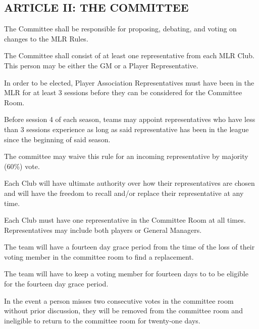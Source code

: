 \subsection{ARTICLE II: THE COMMITTEE}
\begin{deepEnumerate}
    \item The Committee shall be responsible for proposing, debating, and voting on changes to the MLR Rules.
    \item The Committee shall consist of at least one representative from each MLR Club. This person may be either the GM or a Player Representative.
    \begin{deepEnumerate}
        \item In order to be elected, Player Association Representatives must have been in the MLR for at least 3 sessions before they can be considered for the Committee Room.
        \begin{deepEnumerate}
            \item Before session 4 of each season, teams may appoint representatives who have less than 3 sessions experience as long as said representative 
            has been in the league since the beginning of said season.
            \item The committee may waive this rule for an incoming representative by majority (60\%) vote.
        \end{deepEnumerate}
    \end{deepEnumerate}
    \item Each Club will have ultimate authority over how their representatives are chosen and will have the freedom to recall and/or replace their representative at any time.
    \item Each Club must have one representative in the Committee Room at all times. Representatives may include both players or General Managers.
    \begin{deepEnumerate}
        \item The team will have a fourteen day grace period from the time of the loss of their voting member in the committee room to find a replacement.
        \item The team will have to keep a voting member for fourteen days to to be eligible for the fourteen day grace period.
    \end{deepEnumerate}
    \item In the event a person misses two consecutive votes in the committee room without prior discussion, they will be removed from the committee room 
    and ineligible to return to the committee room for twenty-one days.
\end{deepEnumerate}

